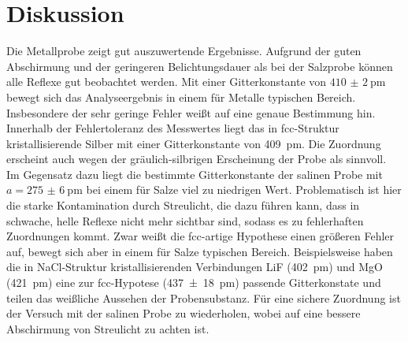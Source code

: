 \section{Diskussion}
Die Metallprobe zeigt gut auszuwertende Ergebnisse. Aufgrund der guten Abschirmung
und der geringeren Belichtungsdauer als bei der Salzprobe können alle Reflexe gut
beobachtet werden. Mit einer Gitterkonstante von $\SI{410(2)}{\pico\metre}$
bewegt sich das Analyseergebnis in einem für Metalle typischen Bereich.
Insbesondere der sehr geringe Fehler weißt auf eine genaue Bestimmung hin.
Innerhalb der Fehlertoleranz des Messwertes liegt das in fcc-Struktur kristallisierende
Silber mit einer Gitterkonstante von \SI{409}{\pico\metre}\cite{AM}. Die Zuordnung erscheint
auch wegen der gräulich-silbrigen Erscheinung der Probe als sinnvoll.\\
Im Gegensatz dazu liegt die bestimmte Gitterkonstante der salinen Probe mit
$a=\SI{275(6)}{\pico\metre}$ bei einem für Salze viel zu niedrigen Wert.
Problematisch ist hier
die starke Kontamination durch Streulicht, die dazu führen kann, dass in schwache,
helle Reflexe nicht mehr sichtbar sind, sodass es zu fehlerhaften Zuordnungen kommt.
Zwar weißt die fcc-artige Hypothese einen größeren Fehler auf, bewegt sich aber
in einem für Salze typischen Bereich. Beispielsweise haben die in NaCl-Struktur
kristallisierenden Verbindungen LiF (\SI{402}{\pico\metre}\cite{AM}) und
MgO (\SI{421}{\pico\metre}\cite{AM}) eine zur fcc-Hypotese (\SI{437(18)}{\pico\metre}) passende
Gitterkonstate und teilen das weißliche Aussehen der Probensubstanz.
Für eine sichere Zuordnung ist der Versuch mit der salinen Probe zu wiederholen,
wobei auf eine bessere Abschirmung von Streulicht zu achten ist.
